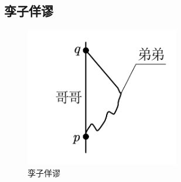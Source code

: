 \subsection{孪子佯谬}
\begin{figure}[htbp]
    \centering
    \includegraphics[width=0.6\textwidth]{Pictures/6-10.png}
    \caption{孪子佯谬}
    \label{fig:6-10}
\end{figure}